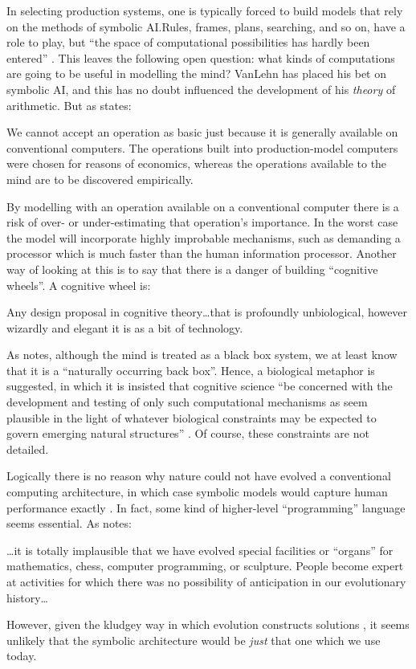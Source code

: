 In selecting production systems, one is typically forced to
build models that rely on the methods of symbolic AI.\@ Rules, frames,
plans, searching, and so on, have
a role to play, but ``the space of computational possibilities has hardly
been entered'' \cite[p.~260]{bodecomp}.  This leaves the following
open question: what kinds of computations are going to be useful in
modelling the mind?  VanLehn has placed his bet on symbolic AI, and this
has no doubt influenced the development of his {\em theory} of arithmetic.
But as  states:
\begin{ssquote}
We cannot accept an operation as basic just because it is
generally available on conventional computers.  The operations built
into production-model computers were chosen for reasons of economics,
whereas the operations available to the mind are to be discovered
empirically.
\end{ssquote}
By modelling with an operation available on
a conventional computer there is a risk of over- or under-estimating that
operation's importance.  In the worst case the model will
incorporate highly improbable mechanisms, such as demanding a processor
which is much faster than the human information processor.
Another way of looking at this is to say that there is a danger of building
``cognitive wheels''.  A cognitive wheel is:
\begin{ssquote}
Any design proposal in cognitive theory\ldots that is profoundly
unbiological, however wizardly and elegant it is as a bit of technology.

\hfill \cite[p.~147]{denncogn}
\end{ssquote}
As  notes, although the mind is treated as a black
box system, we at least know that it is a ``naturally occurring back box''.
Hence, a biological metaphor is suggested, in which it is insisted that
cognitive science ``be concerned with the development and testing of only
such computational mechanisms as seem plausible in the light of whatever
biological constraints may be expected to govern emerging natural
structures'' \cite[p.~47]{clarbiol}.  Of course, these constraints are not
detailed.

Logically there is no reason why nature could not have evolved a
conventional computing architecture, in which case symbolic models would
capture human performance exactly \cite{clarconn,micro}.  In fact, some
kind of higher-level ``programming'' language seems essential.  As
 notes:
\begin{ssquote}
\ldots it is totally implausible that we have evolved special facilities or
``organs'' for mathematics, chess, computer programming, or sculpture.
People become expert at activities for which there was no possibility of
anticipation in our evolutionary history\ldots
\end{ssquote}
However, given the kludgey way in which evolution constructs solutions
\cite{clarklud}, it seems unlikely that the symbolic architecture would be
{\em just} that one which we use today.


